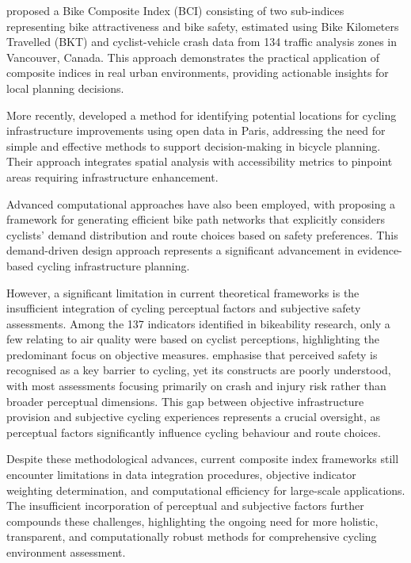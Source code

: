 \documentclass[
  12pt,
  oneside]{book}
\begin{document}
\textcite{kamel_composite_2020} proposed a Bike Composite Index (BCI) consisting of two sub-indices representing bike attractiveness and bike safety, estimated using Bike Kilometers Travelled (BKT) and cyclist-vehicle crash data from 134 traffic analysis zones in Vancouver, Canada. This approach demonstrates the practical application of composite indices in real urban environments, providing actionable insights for local planning decisions.

More recently, \textcite{wysling_where_2022} developed a method for identifying potential locations for cycling infrastructure improvements using open data in Paris, addressing the need for simple and effective methods to support decision-making in bicycle planning. Their approach integrates spatial analysis with accessibility metrics to pinpoint areas requiring infrastructure enhancement.

Advanced computational approaches have also been employed, with \textcite{steinacker_demand-driven_2022} proposing a framework for generating efficient bike path networks that explicitly considers cyclists' demand distribution and route choices based on safety preferences. This demand-driven design approach represents a significant advancement in evidence-based cycling infrastructure planning.

However, a significant limitation in current theoretical frameworks is the insufficient integration of cycling perceptual factors and subjective safety assessments. Among the 137 indicators identified in bikeability research, only a few relating to air quality were based on cyclist perceptions, highlighting the predominant focus on objective measures. \textcite{duren_identifying_2023} emphasise that perceived safety is recognised as a key barrier to cycling, yet its constructs are poorly understood, with most assessments focusing primarily on crash and injury risk rather than broader perceptual dimensions. This gap between objective infrastructure provision and subjective cycling experiences represents a crucial oversight, as perceptual factors significantly influence cycling behaviour and route choices.

Despite these methodological advances, current composite index frameworks still encounter limitations in data integration procedures, objective indicator weighting determination, and computational efficiency for large-scale applications. The insufficient incorporation of perceptual and subjective factors further compounds these challenges, highlighting the ongoing need for more holistic, transparent, and computationally robust methods for comprehensive cycling environment assessment.
\end{document}
